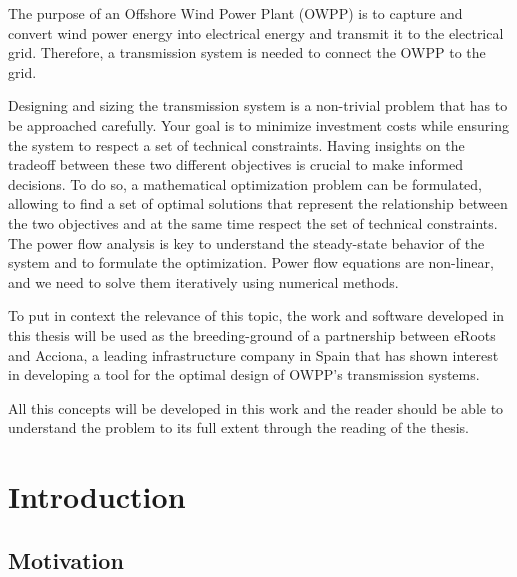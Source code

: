 \documentclass[a4paper,11pt, titlepage, twoside]{article}
\begin{document}
The purpose of an Offshore Wind Power Plant (OWPP) is to capture and convert wind power energy into electrical energy and transmit it to the electrical grid.
Therefore, a transmission system is needed to connect the OWPP to the grid. 

Designing and sizing the transmission system is a non-trivial problem that has to be approached carefully. Your goal is to minimize investment costs while ensuring the system to respect a set of technical constraints. Having insights on the tradeoff between these two different objectives
is crucial to make informed decisions. To do so, a mathematical optimization problem can be formulated, allowing to find a set of optimal solutions that represent the relationship between the two objectives and at the same time respect the set of technical constraints.
The power flow analysis is key to understand the steady-state behavior of the system and to formulate the optimization. Power flow equations are non-linear, and we need to solve them iteratively using numerical methods. 

To put in context the relevance of this topic, the work and software developed in this thesis will be used
as the breeding-ground of a partnership between eRoots and Acciona, a leading infrastructure company in Spain that has shown interest in developing a tool for the optimal design
of OWPP's transmission systems.

All this concepts will be developed in this work and the reader should be able to understand the problem to its full extent through the reading of the thesis.






\section{Introduction}\label{Introduction}

\subsection{Motivation}
\end{document}
